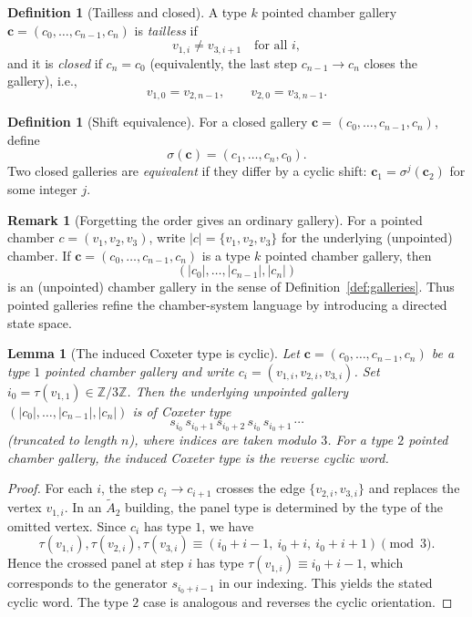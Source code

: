 \documentclass[11pt]{amsart}
\newtheorem{lemma}[thm]{Lemma}
\theoremstyle{definition}
\newtheorem{definition}[thm]{Definition}
\newtheorem{remark}[thm]{Remark}
\theoremstyle{remark}
\numberwithin{equation}{section}
\begin{document}
\begin{definition}[Tailless and closed]\label{def:tailless-closed}
A type $k$ pointed chamber gallery $\mathbf{c}=(c_0,\ldots,c_{n-1},c_n)$ is \emph{tailless} if
\[
v_{1,i}\neq v_{3,i+1}\quad\text{for all }i,
\]
and it is \emph{closed} if $c_n=c_0$ (equivalently, the last step $c_{n-1}\to c_n$ closes the gallery), i.e.,
\[
v_{1,0}=v_{2,n-1},\qquad v_{2,0}=v_{3,n-1}.
\]
\end{definition}

\begin{definition}[Shift equivalence]\label{def:shift-equivalence-pgl3}
For a closed gallery $\mathbf{c}=(c_0,\ldots,c_{n-1},c_n)$, define
\[
\sigma(\mathbf{c})=(c_1,\ldots,c_n,c_0).
\]
Two closed galleries are \emph{equivalent} if they differ by a cyclic shift:
$\mathbf{c}_1=\sigma^j(\mathbf{c}_2)$ for some integer $j$.
\end{definition}

\begin{remark}[Forgetting the order gives an ordinary gallery]\label{rem:pointed-refines-standard-gallery}
For a pointed chamber $c=(v_1,v_2,v_3)$, write $|c|=\{v_1,v_2,v_3\}$ for the underlying (unpointed) chamber.
If $\mathbf{c}=(c_0,\ldots,c_{n-1},c_n)$ is a type $k$ pointed chamber gallery, then
\[
(|c_0|,\ldots,|c_{n-1}|,|c_n|)
\]
is an (unpointed) chamber gallery in the sense of Definition~\ref{def:galleries}.
Thus pointed galleries refine the chamber-system language by introducing a directed state space.
\end{remark}

\begin{lemma}[The induced Coxeter type is cyclic]\label{lem:pointed-implies-coxeter-type-cyclic}
Let $\mathbf{c}=(c_0,\ldots,c_{n-1},c_n)$ be a type $1$ pointed chamber gallery and write $c_i=(v_{1,i},v_{2,i},v_{3,i})$.
Set $i_0=\tau(v_{1,1})\in \mathbb{Z}/3\mathbb{Z}$.
Then the underlying unpointed gallery $(|c_0|,\ldots,|c_{n-1}|,|c_n|)$ is of Coxeter type
\[
s_{i_0}\, s_{i_0+1}\, s_{i_0+2}\, s_{i_0}\, s_{i_0+1}\,\cdots
\]
(truncated to length $n$), where indices are taken modulo $3$.
For a type $2$ pointed chamber gallery, the induced Coxeter type is the reverse cyclic word.
\end{lemma}

\begin{proof}
For each $i$, the step $c_i\to c_{i+1}$ crosses the edge $\{v_{2,i},v_{3,i}\}$ and replaces the vertex $v_{1,i}$.
In an $\widetilde{A}_2$ building, the panel type is determined by the type of the omitted vertex.
Since $c_i$ has type $1$, we have
\[
\tau(v_{1,i}),\tau(v_{2,i}),\tau(v_{3,i}) \equiv (i_0+i-1,\ i_0+i,\ i_0+i+1)\pmod{3}.
\]
Hence the crossed panel at step $i$ has type $\tau(v_{1,i})\equiv i_0+i-1$, which corresponds to the generator
$s_{i_0+i-1}$ in our indexing. This yields the stated cyclic word.
The type $2$ case is analogous and reverses the cyclic orientation.
\end{proof}
\end{document}
